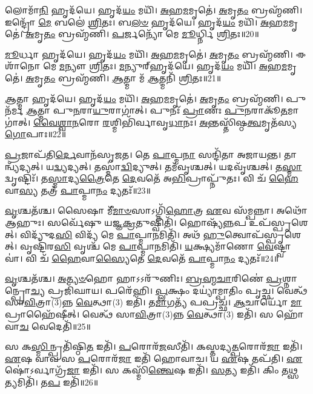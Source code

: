    𑌲𑍋𑌮𑌾᳴\-\ul{𑌨𑌿} 𑌹𑍃𑌦᳴𑌯𑍇।
   𑌹𑍃𑌦᳴\-\ul{𑌯𑌂} 𑌮𑌯𑌿᳴।
   \ul{𑌅}\-𑌹\-\ul{𑌮}\-𑌮𑍃𑌤𑍇॑।
   \ul{𑌅}\-𑌮𑍃\-\ul{𑌤𑌂} 𑌬𑍍𑌰𑌹𑍍𑌮᳴𑌣𑌿।
   𑌇𑌨𑍍𑌦𑍍𑌰𑍋᳴ \ul{𑌮𑍇} 𑌬𑌲𑍇॑ \ul{𑌶𑍍𑌰𑌿}\-𑌤𑌃।
   𑌬\-\ul{𑌲}\-\-\ul{𑍞} 𑌹𑍃𑌦᳴𑌯𑍇।
   𑌹𑍃𑌦᳴\-\ul{𑌯𑌂} 𑌮𑌯𑌿᳴।
   \ul{𑌅}\-𑌹\-\ul{𑌮}\-𑌮𑍃𑌤𑍇॑।
   \ul{𑌅}\-𑌮𑍃\-\ul{𑌤𑌂} 𑌬𑍍𑌰𑌹𑍍𑌮᳴𑌣𑌿।
   \ul{𑌪}\-𑌰𑍍𑌜𑌨𑍍𑌯𑍋᳴ 𑌮𑍇 \ul{𑌮𑍂}\-𑌰𑍍𑌧𑍍𑌨𑌿 \ul{𑌶𑍍𑌰𑌿}\-𑌤𑌃॥20॥

   \ul{𑌮𑍂}\-𑌰𑍍𑌧𑌾 𑌹𑍃𑌦᳴𑌯𑍇।
   𑌹𑍃𑌦᳴\-\ul{𑌯𑌂} 𑌮𑌯𑌿᳴।
   \ul{𑌅}\-𑌹\-\ul{𑌮}\-𑌮𑍃𑌤𑍇॑।
   \ul{𑌅}\-𑌮𑍃\-\ul{𑌤𑌂} 𑌬𑍍𑌰𑌹𑍍𑌮᳴𑌣𑌿।
   𑌈𑌶𑌾᳴𑌨𑍋 𑌮𑍇 \ul{𑌮}\-𑌨𑍍𑌯𑍗 \ul{𑌶𑍍𑌰𑌿}\-𑌤𑌃।
   \ul{𑌮}\-𑌨𑍍𑌯𑍁𑌰𑍍{‌}𑌹𑍃𑌦᳴𑌯𑍇।
   𑌹𑍃𑌦᳴\-\ul{𑌯𑌂} 𑌮𑌯𑌿᳴।
   \ul{𑌅}\-𑌹\-\ul{𑌮}\-𑌮𑍃𑌤𑍇॑।
   \ul{𑌅}\-𑌮𑍃\-\ul{𑌤𑌂} 𑌬𑍍𑌰𑌹𑍍𑌮᳴𑌣𑌿।
   \ul{𑌆}\-𑌤𑍍𑌮𑌾 𑌮᳴ \ul{𑌆}\-𑌤𑍍𑌮𑌨𑌿᳴ \ul{𑌶𑍍𑌰𑌿}\-𑌤𑌃॥21॥
   
   \ul{𑌆}\-𑌤𑍍𑌮𑌾 𑌹𑍃𑌦᳴𑌯𑍇।
   𑌹𑍃𑌦᳴\-\ul{𑌯𑌂} 𑌮𑌯𑌿᳴।
   \ul{𑌅}\-𑌹\-\ul{𑌮}\-𑌮𑍃𑌤𑍇॑।
   \ul{𑌅}\-𑌮𑍃\-\ul{𑌤𑌂} 𑌬𑍍𑌰𑌹𑍍𑌮᳴𑌣𑌿।
   𑌪𑍁𑌨᳴𑌰𑍍𑌮 \ul{𑌆}\-𑌤𑍍𑌮𑌾 𑌪𑍁\-\ul{𑌨}\-𑌰𑌾\-\ul{𑌯𑍁}\-𑌰𑌾𑌗𑌾॑𑌤𑍍।
   𑌪𑍁𑌨𑌃᳴ \ul{𑌪𑍍𑌰𑌾}\-𑌣𑌃 \ul{𑌪𑍁}\-𑌨𑌰𑌾𑌕𑍂᳴\-\ul{𑌤}\-𑌮𑌾𑌗𑌾॑𑌤𑍍।
   \ul{𑌵𑍈}\-\-\ul{𑌶𑍍𑌵𑌾}\-\-\ul{𑌨}\-𑌰𑍋 \ul{𑌰}\-𑌶𑍍𑌮𑌿𑌭𑌿᳴𑌰𑍍𑌵𑌾𑌵𑍃\-\ul{𑌧𑌾}\-𑌨𑌃।
   \ul{𑌅}\-𑌨𑍍𑌤𑌸𑍍𑌤𑌿᳴𑌷𑍍𑌠\-\ul{𑌤𑍍𑌵}\-𑌮𑍃𑌤᳴𑌸𑍍𑌯 \ul{𑌗𑍋}\-𑌪𑌾𑌃॥22॥
\anuvakamend

   \ul{𑌪𑍍𑌰}\-𑌜𑌾𑌪᳴𑌤𑌿\-\ul{𑌰𑍍𑌦𑍇}\-𑌵𑌾𑌨᳴𑌸𑍃𑌜𑌤।
   𑌤𑍇 \ul{𑌪𑌾}\-𑌪𑍍𑌮\-\ul{𑌨𑌾} 𑌸𑌨𑍍𑌦𑌿᳴𑌤𑌾 𑌅𑌜𑌾𑌯𑌨𑍍𑌤।
   𑌤𑌾𑌨𑍍𑌵𑍍𑌯᳴\-𑌦𑍍𑌯𑌤𑍍।
   𑌯\-\ul{𑌦𑍍𑌵𑍍𑌯}\-𑌦𑍍𑌯𑌤𑍍।
   𑌤𑌸𑍍𑌮𑌾॑\-\ul{𑌦𑍍𑌵𑌿}\-𑌦𑍍𑌯𑍁𑌤𑍍।
   𑌤𑌮᳴𑌵𑍃𑌶𑍍𑌚𑌤𑍍।
   𑌯𑌦𑌵𑍃᳴𑌶𑍍𑌚𑌤𑍍।
   𑌤\-\ul{𑌸𑍍𑌮𑌾}\-𑌦𑍍𑌵𑍃𑌷𑍍𑌟𑌿𑌃᳴।
   𑌤\-\ul{𑌸𑍍𑌮𑌾}\-𑌦𑍍𑌯\-\ul{𑌤𑍍𑌰𑍈}\-𑌤𑍇 \ul{𑌦𑍇}\-𑌵𑌤𑍇᳴ 𑌅\-\ul{𑌭𑌿}\-𑌪𑍍𑌰𑌾𑌪𑍍𑌨𑍁᳴𑌤𑌃।
   𑌵𑌿 𑌚᳴ \ul{𑌹𑍈}\-𑌵𑌾\-\ul{𑌸𑍍𑌯} 𑌤𑌤𑍍𑌰᳴ \ul{𑌪𑌾}\-𑌪𑍍𑌮𑌾\-\ul{𑌨𑌂} 𑌦𑍍𑌯𑌤𑌃᳴॥23॥

   \ul{𑌵𑍃}\-𑌶𑍍𑌚𑌤᳴𑌶𑍍𑌚।
   𑌸𑍈𑌷𑌾 𑌮𑍀᳴\-\ul{𑌮𑌾}\-\-\ul{𑍞}\-𑌸𑌾𑌽𑌗𑍍𑌨𑌿᳴\-\ul{𑌹𑍋}\-𑌤𑍍𑌰 \ul{𑌏}\-𑌵 𑌸᳴𑌮𑍍𑌪𑌨𑍍𑌨𑌾।
   𑌅𑌥𑍋᳴ 𑌆𑌹𑍁𑌃।
   𑌸𑌰𑍍𑌵𑍇᳴𑌷𑍁 𑌯𑌜𑍍𑌞\-\ul{𑌕𑍍𑌰}\-𑌤𑍁𑌷𑍍𑌵𑌿𑌤𑌿᳴।
   𑌹𑍋𑌷𑍍𑌯᳴\-\ul{𑌨𑍍𑌨}\-𑌪 𑌉𑌪᳴𑌸𑍍𑌪𑍃𑌶𑍇𑌤𑍍।
   𑌵𑌿𑌦𑍍𑌯𑍁᳴𑌦\-\ul{𑌸𑌿} 𑌵𑌿𑌦𑍍𑌯᳴ 𑌮𑍇 \ul{𑌪𑌾}\-𑌪𑍍𑌮𑌾\-\ul{𑌨}\-𑌮𑌿𑌤𑌿᳴।
   𑌅𑌥᳴ \ul{𑌹𑍁}\-𑌤𑍍𑌵𑍋𑌪᳴𑌸𑍍𑌪𑍃𑌶𑍇𑌤𑍍।
   𑌵𑍃𑌷𑍍𑌟𑌿᳴𑌰\-\ul{𑌸𑌿} 𑌵𑍃𑌶𑍍𑌚᳴ 𑌮𑍇 \ul{𑌪𑌾}\-𑌪𑍍𑌮𑌾\-\ul{𑌨}\-𑌮𑌿𑌤𑌿᳴।
   \ul{𑌯}\-𑌕𑍍𑌷𑍍𑌯𑌮𑌾᳴𑌣𑍋 \ul{𑌵𑍇}\-𑌷𑍍𑌟𑍍𑌵𑌾 𑌵𑌾॑।
   𑌵𑌿 𑌚᳴ \ul{𑌹𑍈}\-𑌵𑌾\-\ul{𑌸𑍍𑌯𑍈}\-𑌤𑍇 \ul{𑌦𑍇}\-𑌵𑌤𑍇᳴ \ul{𑌪𑌾}\-𑌪𑍍𑌮𑌾\-\ul{𑌨𑌂} 𑌦𑍍𑌯𑌤𑌃᳴॥24॥

   \ul{𑌵𑍃}\-𑌶𑍍𑌚𑌤᳴𑌶𑍍𑌚।
   \ul{𑌅}\-\-\ul{𑌤𑍍𑌯}\-\-\ul{𑍞}\-𑌹𑍋 𑌹𑌾𑌽𑌽𑌰𑍁᳴𑌣𑌿𑌃।
   \ul{𑌬𑍍𑌰}\-\-\ul{𑌹𑍍𑌮}\-\-\ul{𑌚𑌾}\-𑌰𑌿𑌣𑍇॑ \ul{𑌪𑍍𑌰}\-𑌶𑍍𑌨𑌾𑌨𑍍𑌪𑍍𑌰𑍋\-\ul{𑌚𑍍𑌯} 𑌪𑍍𑌰𑌜𑌿᳴𑌘𑌾𑌯।
   𑌪𑌰𑍇᳴𑌹𑌿।
   \ul{𑌪𑍍𑌲}\-𑌕𑍍𑌷𑌂 𑌦𑌯𑍍𑌯𑌾॑𑌮𑍍𑌪𑌾𑌤𑌿𑌂 𑌪𑍃𑌚𑍍𑌛।
   𑌵𑍇𑌤𑍍𑌥᳴ 𑌸𑌾\-\ul{𑌵𑌿}\-𑌤𑍍𑌰𑌾(3)𑌨𑍍𑌨 \ul{𑌵𑍇}\-𑌤𑍍𑌥𑌾(3) 𑌇𑌤𑌿᳴।
   𑌤\-\ul{𑌮𑌾}\-𑌗𑌤𑍍𑌯᳴ 𑌪𑌪𑍍𑌰𑌚𑍍𑌛।
   \ul{𑌆}\-𑌚𑌾𑌰𑍍𑌯𑍋᳴ \ul{𑌮𑌾} 𑌪𑍍𑌰𑌾𑌹𑍈᳴𑌷𑍀𑌤𑍍।
   𑌵𑍇𑌤𑍍𑌥᳴ 𑌸𑌾\-\ul{𑌵𑌿}\-𑌤𑍍𑌰𑌾(3)𑌨𑍍𑌨 \ul{𑌵𑍇}\-𑌤𑍍𑌥𑌾(3) 𑌇𑌤𑌿᳴।
   𑌸 𑌹𑍋᳴𑌵𑌾\-\ul{𑌚} 𑌵𑍇𑌦𑍇𑌤𑌿᳴॥25॥

   𑌸 𑌕\-\ul{𑌸𑍍𑌮𑌿}\-𑌨𑍍𑌪𑍍𑌰𑌤𑌿᳴𑌷𑍍𑌠𑌿\-\ul{𑌤} 𑌇𑌤𑌿᳴।
   \ul{𑌪}\-𑌰𑍋𑌰᳴\-\ul{𑌜}\-𑌸𑍀𑌤𑌿᳴।
   𑌕𑌸𑍍𑌤𑌦𑍍𑌯\-\ul{𑌤𑍍𑌪}\-𑌰𑍋𑌰᳴\-\ul{𑌜𑌾} 𑌇𑌤𑌿᳴।
   \ul{𑌏}\-𑌷 𑌵𑌾𑌵 𑌸 \ul{𑌪}\-𑌰𑍋𑌰᳴\-\ul{𑌜𑌾} 𑌇𑌤𑌿᳴ 𑌹𑍋𑌵𑌾𑌚।
   𑌯 \ul{𑌏}\-𑌷 𑌤𑌪᳴𑌤𑌿।
   \ul{𑌏}\-𑌷𑍋॑𑌽𑌰𑍍𑌵𑌾𑌗𑍍𑌰᳴\-\ul{𑌜𑌾} 𑌇𑌤𑌿᳴।
   𑌸 𑌕𑌸𑍍𑌮𑌿᳴\-\ul{𑌨𑍍𑌤𑍍𑌵𑍇}\-𑌷 𑌇𑌤𑌿᳴।
   \ul{𑌸}\-𑌤𑍍𑌯 𑌇𑌤𑌿᳴।
   𑌕𑌿𑌂 𑌤\-\ul{𑌥𑍍𑌸}\-𑌤𑍍𑌯𑌮𑌿𑌤𑌿᳴।
   𑌤\-\ul{𑌪} 𑌇𑌤𑌿᳴॥26॥

